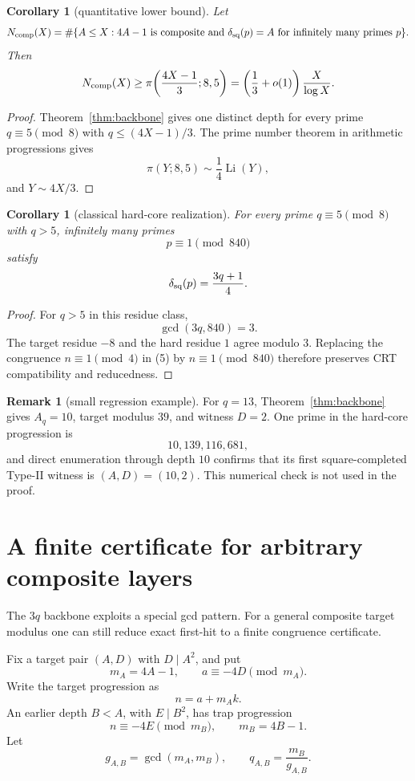 \documentclass[11pt]{article}
\newtheorem{corollary}[theorem]{Corollary}
\theoremstyle{definition}
\newtheorem{remark}[theorem]{Remark}
\begin{document}
\begin{corollary}[quantitative lower bound]\label{cor:count}
Let
\[
N_{\rm comp}(X)
=\#\{A\le X:4A-1\text{ is composite and }\delta_{\rm sq}(p)=A
\text{ for infinitely many primes }p\}.
\]
Then
\[
N_{\rm comp}(X)
\ge
\pi\!\left(\frac{4X-1}{3};8,5\right)
=\left(\frac13+o(1)\right)\frac{X}{\log X}.
\]
\end{corollary}

\begin{proof}
Theorem~\ref{thm:backbone} gives one distinct depth for every prime $q\equiv5\pmod8$ with $q\le(4X-1)/3$.  The prime number theorem in arithmetic progressions gives
\[
\pi(Y;8,5)\sim\frac14\operatorname{Li}(Y),
\]
and $Y\sim4X/3$.
\end{proof}

\begin{corollary}[classical hard-core realization]
For every prime $q\equiv5\pmod8$ with $q>5$, infinitely many primes
\[
p\equiv1\pmod{840}
\]
satisfy
\[
\delta_{\rm sq}(p)=\frac{3q+1}{4}.
\]
\end{corollary}

\begin{proof}
For $q>5$ in this residue class,
\[
\gcd(3q,840)=3.
\]
The target residue $-8$ and the hard residue $1$ agree modulo $3$.  Replacing the congruence $n\equiv1\pmod4$ in (5) by $n\equiv1\pmod{840}$ therefore preserves CRT compatibility and reducedness.
\end{proof}

\begin{remark}[small regression example]
For $q=13$, Theorem~\ref{thm:backbone} gives $A_q=10$, target modulus $39$, and witness $D=2$.  One prime in the hard-core progression is
\[
10{,}139{,}116{,}681,
\]
and direct enumeration through depth $10$ confirms that its first square-completed Type-II witness is $(A,D)=(10,2)$.  This numerical check is not used in the proof.
\end{remark}

\section{A finite certificate for arbitrary composite layers}
The $3q$ backbone exploits a special gcd pattern.  For a general composite target modulus one can still reduce exact first-hit to a finite congruence certificate.

Fix a target pair $(A,D)$ with $D\mid A^2$, and put
\[
m_A=4A-1,
\qquad
a\equiv-4D\pmod{m_A}.
\]
Write the target progression as
\[
n=a+m_Ak. \tag{6}
\]
An earlier depth $B<A$, with $E\mid B^2$, has trap progression
\[
n\equiv-4E\pmod{m_B},
\qquad m_B=4B-1. \tag{7}
\]
Let
\[
g_{A,B}=\gcd(m_A,m_B),
\qquad
q_{A,B}=\frac{m_B}{g_{A,B}}.
\]
\end{document}

